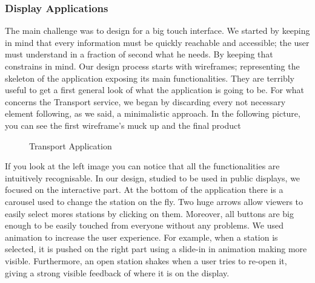 \documentclass[]{usiinfbachelorproject}
\begin{document}
\subsubsection{Display Applications}
The main challenge was to design for a big touch interface. We started by keeping in mind that every information must be quickly reachable and accessible; the user must understand in a fraction of second what he needs. By keeping that constrains in mind.
Our design process starts with wireframes; representing the skeleton of the application exposing its main functionalities. They are terribly useful to get a first general look of what the application is going to be. For what concerns the Transport service, we began by discarding every not necessary element following, as we said, a minimalistic approach. In the following picture, you can see the first wireframe's muck up and the final product
\begin{figure}[H]
  \centering
  \hfill
  \caption{Transport Application}
\end{figure} 
If you look at the left image you can notice that all the functionalities are intuitively recognisable. In our design, studied to be used in public displays, we focused on the interactive part. At the bottom of the application there is a carousel used to change the station on the fly. Two huge arrows allow viewers to easily select mores stations by clicking on them. Moreover, all buttons are big enough to be easily touched from everyone without any problems.
We used animation to increase the user experience. For example, when a station is selected, it is pushed on the right part using a slide-in in animation making more visible. Furthermore, an open station shakes when a user tries to re-open it, giving a strong visible feedback of where it is on the display. 
\end{document}
